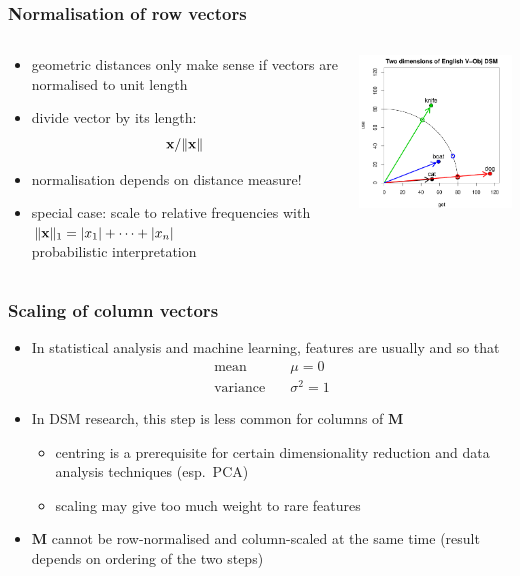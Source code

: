 \documentclass[t]{beamer} %
\begin{document}
\begin{frame}[c]
  \frametitle{Normalisation of row vectors}
  
  \begin{columns}[c]
    \begin{column}{5cm}
      \begin{itemize}
      \item geometric distances only make sense if vectors are normalised to unit length
      \item divide vector by its length: \[ \vx / \norm{\vx} \]
      \item normalisation depends on distance measure!
      \item special case: scale to relative frequencies with
        $\norm[1]{\vx} = \abs{x_1} + \dots + \abs{x_n}$\\
        \so probabilistic interpretation
      \end{itemize}
    \end{column}
    \begin{column}{6cm}
      \includegraphics[width=6cm]{img/hieroglyph_2d_4}
    \end{column}
  \end{columns}
\end{frame}

\begin{frame}
  \frametitle{Scaling of column vectors}

  \begin{itemize}
  \item In statistical analysis and machine learning, features are
    usually  and  so that
    \begin{align*}
      \text{mean} & \quad \mu = 0 \\
      \text{variance} & \quad \sigma^2 = 1
    \end{align*}
  \item In DSM research, this step is less common for columns of $\mathbf{M}$
    \begin{itemize}
    \item centring is a prerequisite for certain dimensionality
      reduction and data analysis techniques (esp.\ PCA)
    \item scaling may give too much weight to rare features
    \end{itemize}
    \pause
  \item $\mathbf{M}$ cannot be row-normalised and column-scaled at the
    same time (result depends on ordering of the two steps)
  \end{itemize}
\end{frame}
\end{document}

